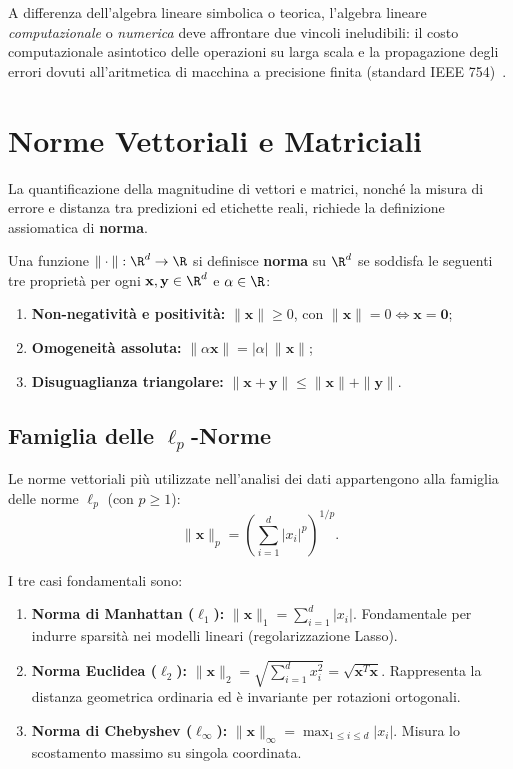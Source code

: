 A differenza dell'algebra lineare simbolica o teorica, l'algebra lineare \emph{computazionale} o \emph{numerica} deve affrontare due vincoli ineludibili: il costo computazionale asintotico delle operazioni su larga scala e la propagazione degli errori dovuti all'aritmetica di macchina a precisione finita (standard IEEE 754)~\cite{trefethen1997numerical}.

\FloatBarrier
\section{Norme Vettoriali e Matriciali}

La quantificazione della magnitudine di vettori e matrici, nonché la misura di errore e distanza tra predizioni ed etichette reali, richiede la definizione assiomatica di \textbf{norma}.

\begin{definition}
Una funzione $\|\cdot\|: \R^d \to \R$ si definisce \textbf{norma} su $\R^d$ se soddisfa le seguenti tre proprietà per ogni $\mathbf{x}, \mathbf{y} \in \R^d$ e $\alpha \in \R$:
\begin{enumerate}
    \item \textbf{Non-negatività e positività:} $\|\mathbf{x}\| \ge 0$, con $\|\mathbf{x}\| = 0 \iff \mathbf{x} = \mathbf{0}$;
    \item \textbf{Omogeneità assoluta:} $\|\alpha \mathbf{x}\| = |\alpha| \, \|\mathbf{x}\|$;
    \item \textbf{Disuguaglianza triangolare:} $\|\mathbf{x} + \mathbf{y}\| \le \|\mathbf{x}\| + \|\mathbf{y}\|$.
\end{enumerate}
\end{definition}

\subsection{Famiglia delle \texorpdfstring{$\ell_p$}{lp}-Norme}

Le norme vettoriali più utilizzate nell'analisi dei dati appartengono alla famiglia delle norme $\ell_p$ (con $p \ge 1$):
\begin{equation}
    \|\mathbf{x}\|_p = \left( \sum_{i=1}^d |x_i|^p \right)^{1/p}.
\end{equation}

I tre casi fondamentali sono:
\begin{enumerate}
    \item \textbf{Norma di Manhattan ($\ell_1$):} $\|\mathbf{x}\|_1 = \sum_{i=1}^d |x_i|$. Fondamentale per indurre sparsità nei modelli lineari (regolarizzazione Lasso).
    \item \textbf{Norma Euclidea ($\ell_2$):} $\|\mathbf{x}\|_2 = \sqrt{\sum_{i=1}^d x_i^2} = \sqrt{\mathbf{x}^T \mathbf{x}}$. Rappresenta la distanza geometrica ordinaria ed è invariante per rotazioni ortogonali.
    \item \textbf{Norma di Chebyshev ($\ell_\infty$):} $\|\mathbf{x}\|_\infty = \max_{1 \le i \le d} |x_i|$. Misura lo scostamento massimo su singola coordinata.
\end{enumerate}

